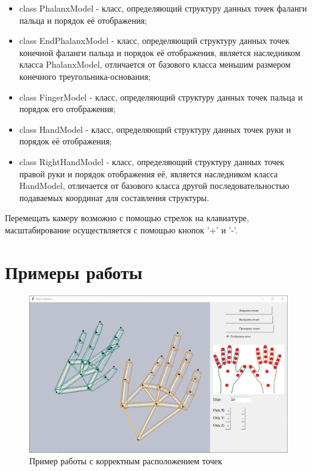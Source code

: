 \begin{itemize}
	\item class PhalanxModel - класс, определяющий структуру данных точек фаланги пальца и порядок её отображения;
	\item class EndPhalanxModel - класс, определяющий структуру данных точек конечной фаланги пальца и порядок её отображения, является наследником класса PhalanxModel, отличается от базового класса меньшим размером конечного треугольника-основания;
	\item class FingerModel - класс, определяющий структуру данных точек пальца и порядок его отображения;
	\item class HandModel - класс, определяющий структуру данных точек руки и порядок её отображения;
	\item class RightHandModel - класс, определяющий структуру данных точек правой руки и порядок отображения её, является наследником класса HandModel, отличается от базового класса другой последовательностью подаваемых координат для составления структуры.
\end{itemize}

\hspace{0.6cm} Перемещать камеру возможно с помощью стрелок на клавиатуре, масштабирование осуществляется с помощью кнопок '+' и '-'.

\section{Примеры работы}

\begin{figure}[ht!]
	\centering
	\includegraphics[scale=0.5]{example1.jpg}
	\caption{Пример работы с корректным расположением точек}
	\label{fig:example1}
\end{figure}

